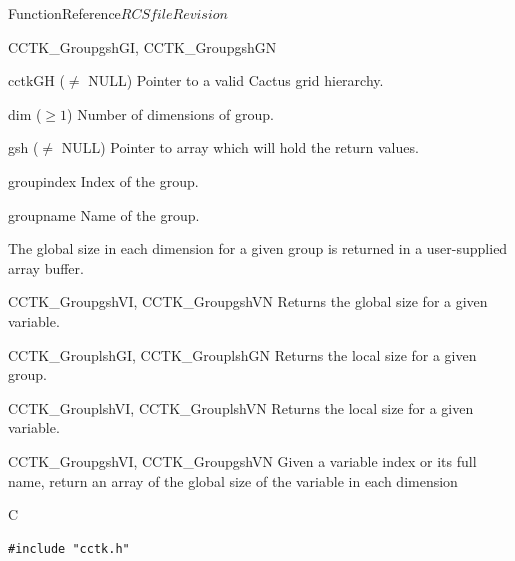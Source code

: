 \begin{cactuspart}{FunctionReference}{$RCSfile$}{$Revision$}
\begin{FunctionDescription}{CCTK\_GroupgshGI, CCTK\_GroupgshGN}
\begin{ParameterSection}
\begin{Parameter}{cctkGH ($\ne$ NULL)} Pointer to a valid Cactus grid hierarchy. \end{Parameter}
\begin{Parameter}{dim ($\ge 1$)} Number of dimensions of group. \end{Parameter}
\begin{Parameter}{gsh ($\ne$ NULL)} Pointer to array which will hold the return values. \end{Parameter}
\begin{Parameter}{groupindex} Index of the group. \end{Parameter}
\begin{Parameter}{groupname} Name of the group. \end{Parameter}
\end{ParameterSection}

\begin{Discussion}
The global size in each dimension for a given group is returned in a user-supplied array buffer.
\end{Discussion}

\begin{SeeAlsoSection}
\begin{SeeAlso}{CCTK\_GroupgshVI, CCTK\_GroupgshVN}
Returns the global size for a given variable.
\end{SeeAlso}
\begin{SeeAlso}{CCTK\_GrouplshGI, CCTK\_GrouplshGN}
Returns the local size for a given group.
\end{SeeAlso}
\begin{SeeAlso}{CCTK\_GrouplshVI, CCTK\_GrouplshVN}
Returns the local size for a given variable.
\end{SeeAlso}
\end{SeeAlsoSection}

\end{FunctionDescription}


\begin{FunctionDescription}{CCTK\_GroupgshVI, CCTK\_GroupgshVN}
\label{CCTK-GroupgshVI}
\label{CCTK-GroupgshVN}
Given a variable index or its full name, return an array of the global size of the variable in each dimension

\begin{SynopsisSection}
\begin{Synopsis}{C}
\begin{verbatim}
#include "cctk.h"


\end{verbatim}
\end{Synopsis}
\end{SynopsisSection}
\end{FunctionDescription}
\end{cactuspart}
